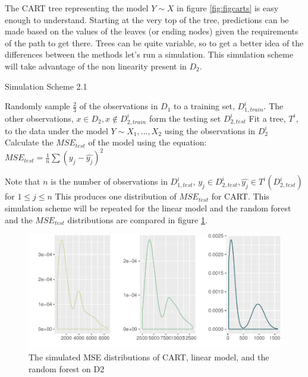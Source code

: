 \documentclass[12pt,twoside]{reedthesis}
\begin{document}
  The CART tree representing the model \(Y \sim X\) in figure
  \ref{fig:figcarts} is easy enough to understand. Starting at the very
  top of the tree, predictions can be made based on the values of the
  leaves (or ending nodes) given the requirements of the path to get
  there. Trees can be quite variable, so to get a better idea of the
  differences between the methods let's run a simulation. This simulation
  scheme will take advantage of the non linearity present in \(D_2\).
  
  \begin{algorithm}
  \caption{Simulation Scheme 2.1}
  \label{sim2.1}
  \begin{algorithmic}[1]
  \State Randomly sample $\frac 2 3$  of the observations in  $D_1$  to a training set,  $D_{1, train}^i$. The other observations,  $x \in D_2, x \notin D_{2, train}^i$ form the testing set $D_{2, test}^i$
  \State Fit a tree, $T^i$, to the data under the model $Y \sim X_1,...,X_2$ using the observations in $D_{2}^i$
  \State Calculate the $MSE_{test}$ of the model using the equation:
      $MSE_{test} = \frac 1 n \sum (y_j - \hat{y_j})^2$
  \EndFor
  \end{algorithmic}
  \end{algorithm}
  
  Note that \(n\) is the number of observations in \(D_{1, test}^i\),
  \(y_j \in D_{2, test}^i, \hat{y_j} \in T^i(D_{2, test}^i)\) for
  \(1 \leq j \leq n\) This produces one distribution of \(MSE_{test}\) for
  CART. This simulation scheme will be repeated for the linear model and
  the random forest and the \(MSE_{test}\) distributions are compared in
  figure \ref{fig:baggedvcartvforest}.
  
  \begin{figure}[htbp]
  \centering
  \includegraphics{Thesis_files/figure-latex/unnamed-chunk-17-1.pdf}
  \caption{\label{fig:unnamed-chunk-17}\label{fig:baggedvcartvforest}The
  simulated MSE distributions of CART, linear model, and the random forest
  on D2}
  \end{figure}
  
\end{document}
